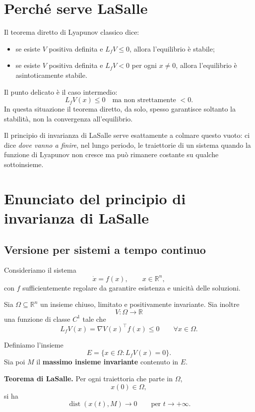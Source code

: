 \section{Perché serve LaSalle}

Il teorema diretto di Lyapunov classico dice:

\begin{itemize}
    \item se esiste \(V\) positiva definita e \(L_fV\le 0\), allora l'equilibrio è stabile;
    \item se esiste \(V\) positiva definita e \(L_fV<0\) per ogni \(x\neq 0\), allora l'equilibrio è asintoticamente stabile.
\end{itemize}

Il punto delicato è il caso intermedio:
\[
L_fV(x)\le 0
\quad \text{ma non strettamente } <0.
\]
In questa situazione il teorema diretto, da solo, spesso garantisce soltanto la stabilità, non la convergenza all'equilibrio.

Il principio di invarianza di LaSalle serve esattamente a colmare questo vuoto: ci dice \emph{dove vanno a finire}, nel lungo periodo, le traiettorie di un sistema quando la funzione di Lyapunov non cresce ma può rimanere costante su qualche sottoinsieme.

\section{Enunciato del principio di invarianza di LaSalle}

\subsection{Versione per sistemi a tempo continuo}

Consideriamo il sistema
\[
\dot x = f(x), \qquad x\in\mathbb{R}^n,
\]
con \(f\) sufficientemente regolare da garantire esistenza e unicità delle soluzioni.

Sia \(\Omega\subseteq \mathbb{R}^n\) un insieme chiuso, limitato e positivamente invariante.  
Sia inoltre
\[
V:\Omega\to\mathbb{R}
\]
una funzione di classe \(C^1\) tale che
\[
L_fV(x)=\nabla V(x)^\top f(x)\le 0
\qquad \forall x\in\Omega.
\]

Definiamo l'insieme
\[
E=\{x\in\Omega : L_fV(x)=0\}.
\]
Sia poi \(M\) il \textbf{massimo insieme invariante} contenuto in \(E\).

\medskip

\noindent
\textbf{Teorema di LaSalle.}
Per ogni traiettoria che parte in \(\Omega\),
\[
x(0)\in\Omega,
\]
si ha
\[
\operatorname{dist}(x(t),M)\to 0
\qquad \text{per } t\to+\infty.
\]

